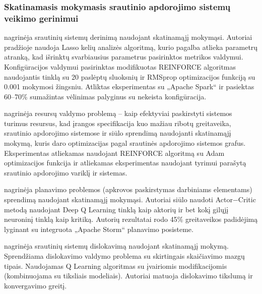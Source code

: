 \documentclass{VUMIFPSbakalaurinis}
\begin{document}
\subsubsection{Skatinamasis mokymasis srautinio apdorojimo sistemų veikimo gerinimui}

\cite{vaquero2018autotuning} nagrinėja srautinių sistemų derinimą naudojant skatinamąjį mokymąsi. Autoriai pradžioje naudoja Lasso kelių analizės algoritmą, kurio pagalba atlieka parametrų atranką, kad išrinktų svarbiausius parametrus pasirinktos metrikos valdymui. Konfigūracijos valdymui pasirinktas modifikuotas REINFORCE algoritmas naudojantis tinklą su 20 paslėptų sluoksnių ir RMSprop optimizacijos funkciją su 0.001 mokymosi žingsniu. Atliktas eksperimentas su „Apache Spark“ ir pasiektas 60–70\% sumažintas vėlinimas palyginus su nekeista konfigūracija.

\cite{ni2019generalizable} nagrinėja resursų valdymo problemą – kaip efektyviai paskirstyti sistemos turimus resursus, kad įrangos specifikacija kuo mažiau ribotų greitaveika, srautinio apdorojimo sistemose ir siūlo sprendimą naudojanti skatinamąjį mokymą, kuris daro optimizacijas pagal srautinės apdorojimo sistemos grafus. Eksperimentas atliekamas naudojant REINFORCE \cite{williams1992simple} algoritmą su Adam optimizacijos funkcija \cite{kingma2014adam} ir atliekamas eksperimentas naudojant tyrimui parašytą srautinio apdorojimo variklį ir sistemas. 

\cite{Li2018Model} nagrinėja planavimo problemos (apkrovos paskirstymas darbiniams elementams) sprendimą naudojant skatinamąjį mokymąsi. Autoriai siūlo naudoti Actor−Critic \cite{lillicrap2015continuous} metodą naudojant Deep Q Learning \cite{mnih2015human} tinklą kaip aktorių ir bet kokį gilųjį neuroninį tinklą kaip kritiką. Autorių rezultatai rodo 45\% greitaveikos padidėjimą lyginant su integruota „Apache Storm“ planavimo posisteme. 

\cite{Russo2019Reinforcement} nagrinėja srautinių sistemų dislokavimą naudojant skatinamąjį mokymą. Sprendžiama dislokavimo valdymo problema su skirtingais skaičiavimo mazgų tipais. Naudojamas Q Learning algoritmas su įvairiomis modifikacijomis (kombinuojama su tiksliais modeliais). Autoriai matuoja dislokavimo tikslumą ir konvergavimo greitį. 
\end{document}

